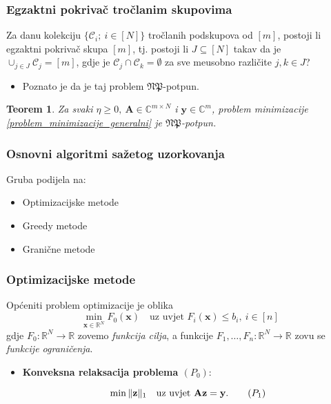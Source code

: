\documentclass{beamer}
\newtheorem{thm}{Teorem}[section]
\newcommand{\R}{\mathbb{R}}
\newcommand{\C}{\mathbb{C}}
\newcommand{\vect}[1]{\mathbf{#1}}
\renewcommand{\vec}{\vect}
\newcommand{\norm}[1]{\|{#1}\|}
\begin{document}
\begin{frame}
    \frametitle{Egzaktni pokriva\v{c} tro\v{c}lanim skupovima}
    Za danu kolekciju $\{\mathcal{C}_i;\ i \in [N]\}$ tro\v{c}lanih podskupova od $[m]$, postoji li egzaktni pokriva\v{c} skupa $[m]$, tj. postoji li $J \subseteq [N]$ takav da je $\cup_{j \in J}\mathcal{C}_j=[m]$, gdje je $\mathcal{C}_j \cap \mathcal{C}_k = \emptyset$ za sve me\dj usobno razli\v{c}ite $j,k \in J$? 
    \bigskip
    \begin{itemize}
        \item Poznato je da je taj problem $\mathfrak{NP}$-potpun.
    \end{itemize}
\begin{thm}
    Za svaki $\eta \geq 0,\ \vec A \in \C^{m \times N}$ i $\vec y \in \C^m$, problem minimizacije \eqref{problem_minimizacije_generalni} je $\mathfrak{NP}$-potpun.
\end{thm}
\end{frame}

\begin{frame}
    \frametitle{Osnovni algoritmi sa\v{z}etog uzorkovanja} 
    Gruba podijela na:
    \begin{itemize}
        \bigskip
        \item Optimizacijske metode
        \bigskip
        \item Greedy metode
        \bigskip
        \item Grani\v{c}ne metode
    \end{itemize}
\end{frame}

\begin{frame}
    \frametitle{Optimizacijske metode}
    Op\'ceniti problem optimizacije je oblika
    \begin{equation*}
        \min_{\vec x \in \R^N} F_0(\vec x)\quad\text{uz uvjet }F_i(\vec x) \leq b_i,\ i \in [n]
    \end{equation*}
    gdje $F_0:\R^N \rightarrow \R$ zovemo \textit{funkcija cilja}, a funkcije $F_1, \dots, F_n: \R^N \rightarrow \R$ zovu se \textit{funkcije ograni\v{c}enja}.

    \vfill
    \begin{itemize}
        \item \textbf{Konveksna relaksacija problema $(P_0)$}:
    
        \begin{equation}
            \min \norm{\vec z}_1 \quad \text{uz uvjet }\vec{Az}=\vec y.\tag{$P_{1}$}\label{problem_minimizacije_l1}
        \end{equation}
    
    \end{itemize}
\end{frame}
\end{document}
